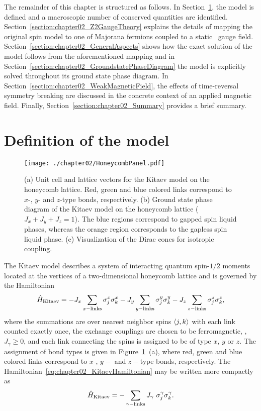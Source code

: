 The remainder of this chapter is structured as follows.
In Section~\ref{section:chapter02_Definition}, the model is defined and a macroscopic number of conserved quantities are identified.
Section~\ref{section:chapter02_Z2GaugeTheory} explains the details of mapping the original spin model to one of Majorana fermions coupled to a static \ZZ~gauge field.
Section~\ref{section:chapter02_GeneralAspects} shows how the exact solution of the model follows from the aforementioned mapping and in Section~\ref{section:chapter02_GroundstatePhaseDiagram} the model is explicitly solved throughout its ground state phase diagram.
In Section~\ref{section:chapter02_WeakMagneticField}, the effects of time-reversal symmetry breaking are discussed in the concrete context of an applied magnetic field.
Finally, Section~\ref{section:chapter02_Summary} provides a brief summary.


%
%
\section{Definition of the model}
\label{section:chapter02_Definition}
%
%
%
\begin{figure}[tb]
	\centering
	\texttt{[image: ./chapter02/HoneycombPanel.pdf]}
	\caption{
		(a) Unit cell and lattice vectors for the Kitaev model on the honeycomb lattice.
		Red, green and blue colored links correspond to $x$-, $y$- and $z$-type bonds, respectively.
		(b) Ground state phase diagram of the Kitaev model on the honeycomb lattice ($J_x + J_y + J_z = 1$).
		The blue regions correspond to gapped spin liquid phases, whereas the orange region corresponds to the gapless spin liquid phase.
		(c) Visualization of the Dirac cones for isotropic coupling.
	}
	\label{fig:chapter02_HoneycombPanel}
\end{figure}
%
The Kitaev model describes a system of interacting quantum spin-$1/2$ moments located at the vertices of a two-dimensional honeycomb lattice and is governed by the Hamiltonian
%
\begin{equation}
	\hat{H}_{\rm Kitaev} = -J_x \sum_{x {\rm -links}} \sigma_j^x \sigma_k^x - J_y \sum_{y {\rm -links}} \sigma_j^y \sigma_k^y - J_z \sum_{z {\rm -links}} \sigma_j^z \sigma_k^z,
	\label{eq:chapter02_KitaevHamiltonian}
\end{equation}
%
where the summations are over nearest neighbor spins $\langle j,k \rangle$ with each link counted exactly once, the exchange couplings are chosen to be ferromagnetic, \ie, $J_{\gamma} \geq 0$, and each link connecting the spins is assigned to be of type $x$, $y$ or $z$.
The assignment of bond types is given in Figure~\ref{fig:chapter02_HoneycombPanel}~(a), where red, green and blue colored links correspond to $x$-, $y-$ and $z-$type bonds, respectively.
The Hamiltonian~\eqref{eq:chapter02_KitaevHamiltonian} may be written more compactly as
%
\begin{equation}
	\hat{H}_{\rm Kitaev} = -\sum_{\gamma {\rm -links}} J_{\gamma}~\sigma_j^{\gamma} \sigma_k^{\gamma}.
	\label{eq:chapter02_KitaevHamiltonianCompact}
\end{equation}
%

